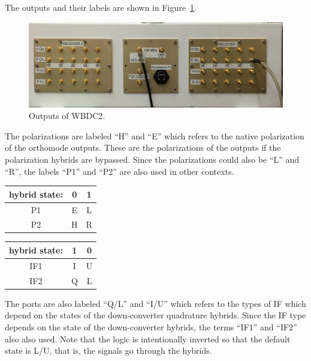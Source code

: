 \documentclass[letterpaper,11pt]{book}
\begin{document}
The outputs and their labels are shown in Figure~\ref{fig:WBDCout}.
\begin{figure}[h!tb]
  \begin{center}
    \includegraphics[width=6in]{WBDC2_outputs.png}
    \caption[WBDC2 outputs]{\label{fig:WBDCout}Outputs of WBDC2.}
  \end{center}
\end{figure}
The polarizations are labeled ``H'' and ``E'' which refers to the native 
polarization of the orthomode outputs.  These are the polarizations of the
outputs if the polarization hybrids are bypassed.  Since the polarizations
could also be ``L'' and ``R'', the labels ``P1'' and ``P2'' are also used
in other contexts.
\begin{center}
\begin{tabular}{|c|cc|}
\hline
hybrid state: & 0 & 1 \\
\hline
P1            & E & L \\
P2            & H & R \\
\hline
\end{tabular}
  \begin{tabular}{|c|cc|}
    \hline
hybrid state: & 1 & 0 \\
\hline
IF1            & I & U \\
IF2            & Q & L \\
\hline
  \end{tabular}
\end{center}
The ports are also labeled
``Q/L'' and ``I/U'' which refers to the types of IF which depend on the states
of the down-converter quadrature hybrids. Since the IF type depends on the state
of the down-converter hybrids, the terms ``IF1'' and ``IF2'' also also used.
Note that the logic is intentionally inverted so that the default state is
L/U, that is, the signals go through the hybrids.
\end{document}
